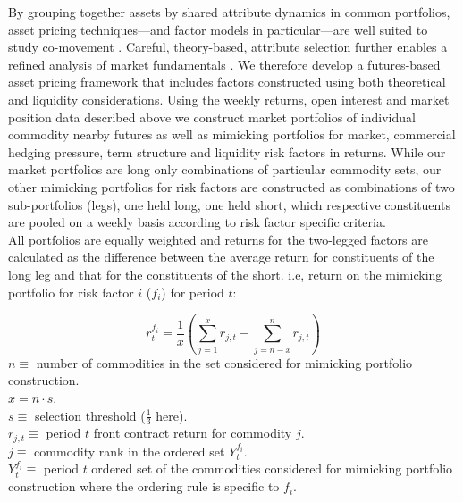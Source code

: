 \documentclass[
  authoryear,
  preprint,
  3p]{elsarticle}
\begin{document}
By grouping together assets by shared attribute dynamics in common
portfolios, asset pricing techniques---and factor models in
particular---are well suited to study co-movement
\citep{fama_common_1993, carhart_persistence_1997, asness_devil_2013, fama_five_factor_2015, hou_digesting_2015, asness_fact_2015, frazzini_betting_2014, asness_quality_2019}.
Careful, theory-based, attribute selection further enables a refined
analysis of market fundamentals
\citep{schwartz_short_2000, miffre_momentum_2007, gorton_fundamentals_2012, cortazar_commodity_2013, yang_investment_2013, daskalaki_factors_2014, szymanowska_anatomy_2014, fernandez_skewness_2018, bakshi_understanding_2019, boons_basis_2019, sakkas_factor_2020}.
We therefore develop a futures-based asset pricing framework that
includes factors constructed using both theoretical and liquidity
considerations. Using the weekly returns, open interest and market
position data described above we construct market portfolios of
individual commodity nearby futures as well as mimicking portfolios for
market, commercial hedging pressure, term structure and liquidity risk
factors in returns. While our market portfolios are long only
combinations of particular commodity sets, our other mimicking
portfolios for risk factors are constructed as combinations of two
sub-portfolios (legs), one held long, one held short, which respective
constituents are pooled on a weekly basis according to risk factor
specific criteria.\\
All portfolios are equally weighted and returns for the two-legged
factors are calculated as the difference between the average return for
constituents of the long leg and that for the constituents of the short.
i.e, return on the mimicking portfolio for risk factor \(i\) (\(f_{i}\))
for period \(t\):

\[r_{t}^{f_{i}} = \frac{1}{x} \left ( \sum_{j=1}^{x}r_{j,t} - \sum_{j=n-x}^{n} r_{j,t} \right )\]
\(n\equiv\) number of commodities in the set considered for mimicking
portfolio construction.\\
\(x = n \cdot s\).\\
\(s\equiv\) selection threshold (\(\frac{1}{3}\) here).\\
\(r_{j,t}\equiv\) period \(t\) front contract return for commodity
\(j\).\\
\(j\equiv\) commodity rank in the ordered set \(Y_{t}^{f_{i}}\).\\
\(Y_{t}^{f_{i}}\equiv\) period \(t\) ordered set of the commodities
considered for mimicking portfolio construction where the ordering rule
is specific to \(f_{i}\).
\end{document}

